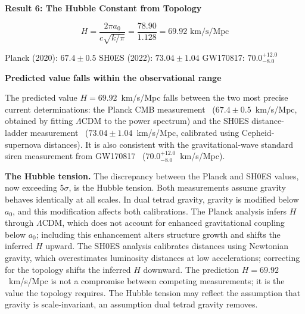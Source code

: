 \documentclass[aps,prd,preprint,superscriptaddress,showpacs,preprintnumbers,amsmath,amssymb,nofootinbib]{revtex4-2}
\begin{document}
\vspace{1em}
\noindent
\colorbox{resultgreen}{\parbox{\dimexpr\textwidth-2\fboxsep\relax}{%
\vspace{0.8em}
\centering
\textbf{\large Result 6: The Hubble Constant from Topology}

\vspace{0.5em}
\boldmath
\begin{equation}
H = \frac{2\pi a_0}{c\sqrt{k/\pi}} = \frac{78.90}{1.128} = 69.92 \text{ km/s/Mpc}
\label{eq:hubble-result}
\end{equation}
\unboldmath

\vspace{0.3em}
Planck (2020): $\bm{67.4 \pm 0.5}$ \quad SH0ES (2022): $\bm{73.04 \pm 1.04}$ \quad GW170817: $\bm{70.0^{+12.0}_{-8.0}}$

\textbf{Predicted value falls within the observational range}
\vspace{0.5em}
}}
\vspace{1em}

The predicted value $H = 69.92$~km/s/Mpc falls between the two most precise current determinations: the Planck CMB measurement~\cite{planck2020} ($67.4 \pm 0.5$~km/s/Mpc, obtained by fitting $\Lambda$CDM to the power spectrum) and the SH0ES distance-ladder measurement~\cite{riess2022} ($73.04 \pm 1.04$~km/s/Mpc, calibrated using Cepheid-supernova distances). It is also consistent with the gravitational-wave standard siren measurement from GW170817~\cite{gw170817} ($70.0^{+12.0}_{-8.0}$~km/s/Mpc).

\textbf{The Hubble tension.} The discrepancy between the Planck and SH0ES values, now exceeding $5\sigma$, is the Hubble tension. Both measurements assume gravity behaves identically at all scales. In dual tetrad gravity, gravity is modified below $a_0$, and this modification affects both calibrations. The Planck analysis infers $H$ through $\Lambda$CDM, which does not account for enhanced gravitational coupling below $a_0$; including this enhancement alters structure growth and shifts the inferred $H$ upward. The SH0ES analysis calibrates distances using Newtonian gravity, which overestimates luminosity distances at low accelerations; correcting for the topology shifts the inferred $H$ downward. The prediction $H = 69.92$~km/s/Mpc is not a compromise between competing measurements; it is the value the topology requires. The Hubble tension may reflect the assumption that gravity is scale-invariant, an assumption dual tetrad gravity removes.
\end{document}
